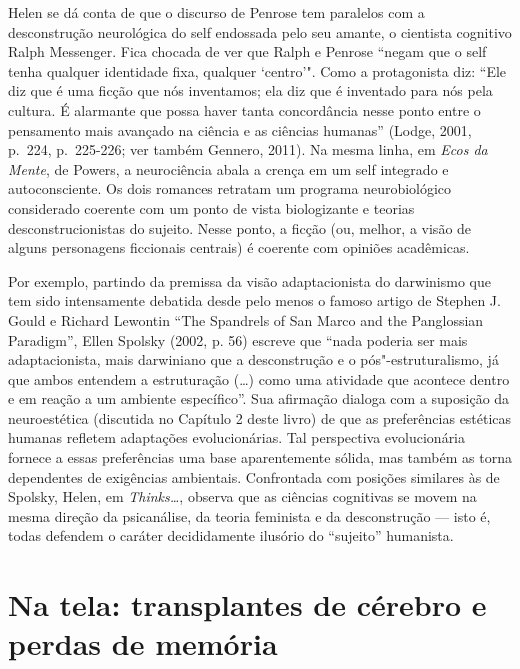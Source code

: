 Helen se dá conta de que o discurso de Penrose tem paralelos com a
desconstrução neurológica do self endossada pelo seu amante, o cientista
cognitivo Ralph Messenger. Fica chocada de ver que Ralph e Penrose
``negam que o self tenha qualquer identidade fixa, qualquer `centro'".
Como a protagonista diz: ``Ele diz que é uma ficção que nós inventamos;
ela diz que é inventado para nós pela cultura. É alarmante que possa
haver tanta concordância nesse ponto entre o pensamento mais avançado na
ciência e as ciências humanas'' (Lodge, 2001, p.~224, p.~225-226; ver
também Gennero, 2011). Na mesma linha, em \emph{Ecos da Mente}, de
Powers, a neurociência abala a crença em um self integrado e
autoconsciente. Os dois romances retratam um programa neurobiológico
considerado coerente com um ponto de vista biologizante e teorias
desconstrucionistas do sujeito. Nesse ponto, a ficção (ou, melhor, a
visão de alguns personagens ficcionais centrais) é coerente com opiniões
acadêmicas.

Por exemplo, partindo da premissa da visão adaptacionista do darwinismo
que tem sido intensamente debatida desde pelo menos o famoso artigo de
Stephen J. Gould e Richard Lewontin ``The Spandrels of San Marco and the
Panglossian Paradigm'', Ellen Spolsky (2002, p. 56) escreve que ``nada
poderia ser mais adaptacionista, mais darwiniano que a desconstrução e o
pós"-estruturalismo, já que ambos entendem a estruturação (\ldots{}) como uma
atividade que acontece dentro e em reação a um ambiente específico''.
Sua afirmação dialoga com a suposição da neuroestética (discutida no
Capítulo 2 deste livro) de que as preferências estéticas humanas
refletem adaptações evolucionárias. Tal perspectiva evolucionária
fornece a essas preferências uma base aparentemente sólida, mas também
as torna dependentes de exigências ambientais. Confrontada com posições
similares às de Spolsky, Helen, em \emph{Thinks\ldots{}}, observa que as
ciências cognitivas se movem na mesma direção da psicanálise, da teoria
feminista e da desconstrução --- isto é, todas defendem o caráter
decididamente ilusório do ``sujeito'' humanista.

\chapter{Na tela: transplantes de cérebro e perdas de memória}

